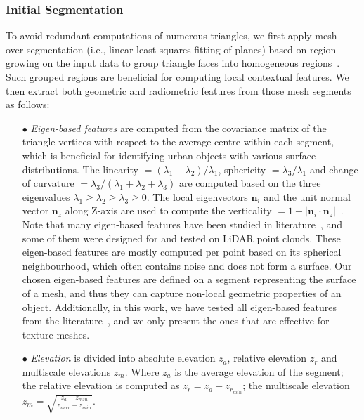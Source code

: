\subsubsection{Initial Segmentation}\label{sec:initial_seg}

To avoid redundant computations of numerous triangles, we first apply mesh over-segmentation (i.e., linear least-squares fitting of planes) based on region growing on the input data to group triangle faces into homogeneous regions~\citep{lafarge2012creating}.
Such grouped regions are beneficial for computing local contextual features.
We then extract both geometric and radiometric features from those mesh segments as follows: 
\begin{itemize}
	\item[$\bullet$] \textit{Eigen-based features} are computed from the covariance matrix of the triangle vertices with respect to the average centre within each segment, which is beneficial for identifying urban objects with various surface distributions.
	The linearity $= (\lambda_{1} - \lambda_{2}) / \lambda_{1}$, sphericity $= \lambda_{3}/ \lambda_{1}$ and change of curvature $= \lambda_{3} / (\lambda_{1} + \lambda_{2} + \lambda_{3})$ are computed based on the three eigenvalues $\lambda_{1} \geq \lambda_{2} \geq \lambda_{3}\geq 0$.
	The local eigenvectors $\mathbf{n}_{i} $ and the unit normal vector $\mathbf{n}_{z} $ along Z-axis are used to compute the verticality $=1-\left | \mathbf{n}_{i}\cdot \mathbf{n}_{z} \right | $~\citep{hackel2016fast}.
	Note that many eigen-based features have been studied in literature~\citep{hackel2016fast,west2004context,weinmann2013feature}, and some of them were designed for and tested on LiDAR point clouds. 
	\textcolor{ao}{
	These eigen-based features are mostly computed per point based on its spherical neighbourhood, which often contains noise and does not form a surface. 
	Our chosen eigen-based features are defined on a segment representing the surface of a mesh, and thus they can capture non-local geometric properties of an object.
	}
	Additionally, in this work, we have tested all eigen-based features from the literature~\citep{hackel2016fast}, and we only present the ones that are effective for texture meshes.
	\item[$\bullet$] \textit{Elevation} is divided into absolute elevation $z_{a}$, relative elevation $z_{r}$ and multiscale elevations $z_{m}$.
	Where $z_{a}$ is the average elevation of the segment;
	the relative elevation is computed as $z_{r} = z_{a}-z_{r_{min}}$;
	the multiscale elevation~\citep{Verdie2015,Rouhani2017} $z_{m} = \sqrt{\frac{z_{a} - z_{min}}{z_{max} - z_{min}}}$.

\end{itemize}

